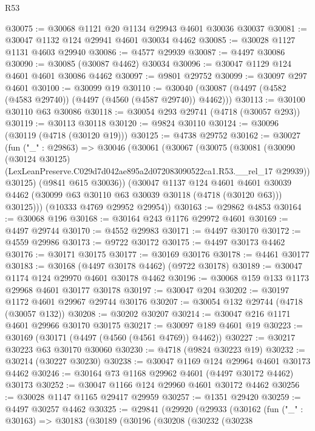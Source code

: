\begin{lexlean}{R53}
\begin{coremodule}
@30075 := @30068 @1121 @20 @1134 @29943 @4601 @30036 @30037
@30081 := @30047 @1132 @124 @29941 @4601 @30034 @4462
@30085 := @30028 @1127 @1131 @4603 @29940
@30086 := @4577 @29939
@30087 := @4497 @30086
@30090 := @30085 (@30087 @4462) @30034
@30096 := @30047 @1129 @124 @4601 @4601 @30086 @4462
@30097 := @9801 @29752
@30099 := @30097 @297 @4601
@30100 := @30099 @19
@30110 := @30040 (@30087 (@4497 (@4582 (@4583 @29740)) (@4497 (@4560 (@4587 @29740)) @4462)))
@30113 := @30100 @30110 @63 @30086
@30118 := @30054 @293 @29741 (@4718 (@30057 @293))
@30119 := @30113 @30118
@30120 := @9824 @30110
@30124 := @30096 (@30119 (@4718 (@30120 @19)))
@30125 := @4738 @29752
@30162 := @30027
    (fun ("_" : @29863) =>
    @30046
      (@30061
        (@30067
          (@30075
            (@30081
              (@30090
                (@30124 @30125)
                (LexLeanPreserve.C029d7d042ae895a2d072083090522ca1.R53.__rel_17 @29939))
              @30125)
            (@9841 @615 @30036))
          (@30047
            @1137
            @124
            @4601
            @4601
            @30039
            @4462
            (@30099 @63 @30110 @63 @30039 @30118 (@4718 (@30120 @63)))
            @30125)))
      (@10333 @4769 @29952 @29954))
@30163 := @29862 @4853
@30164 := @30068 @196
@30168 := @30164 @243 @1176 @29972 @4601
@30169 := @4497 @29744
@30170 := @4552 @29983
@30171 := @4497 @30170
@30172 := @4559 @29986
@30173 := @9722 @30172
@30175 := @4497 @30173 @4462
@30176 := @30171 @30175
@30177 := @30169 @30176
@30178 := @4461 @30177
@30183 := @30168 (@4497 @30178 @4462) (@9722 @30178)
@30189 := @30047 @1174 @124 @29970 @4601 @30178 @4462
@30196 := @30068 @159 @133 @1173 @29968 @4601 @30177 @30178
@30197 := @30047 @204
@30202 := @30197 @1172 @4601 @29967 @29744 @30176
@30207 := @30054 @132 @29744 (@4718 (@30057 @132))
@30208 := @30202 @30207
@30214 := @30047 @216 @1171 @4601 @29966 @30170 @30175
@30217 := @30097 @189 @4601 @19
@30223 := @30169 (@30171 (@4497 (@4560 (@4561 @4769)) @4462))
@30227 := @30217 @30223 @63 @30170 @30060
@30230 := @4718 (@9824 @30223 @19)
@30232 := @30214 (@30227 @30230)
@30238 := @30047 @1169 @124 @29964 @4601 @30173 @4462
@30246 := @30164 @73 @1168 @29962 @4601 (@4497 @30172 @4462) @30173
@30252 := @30047 @1166 @124 @29960 @4601 @30172 @4462
@30256 := @30028 @1147 @1165 @29417 @29959
@30257 := @1351 @29420
@30259 := @4497 @30257 @4462
@30325 := @29841
    (@29920
      (@29933
        (@30162
          (fun ("_" : @30163) =>
          @30183
            (@30189
              (@30196
                (@30208
                  (@30232
                    (@30238

\end{coremodule}
\end{lexlean}
